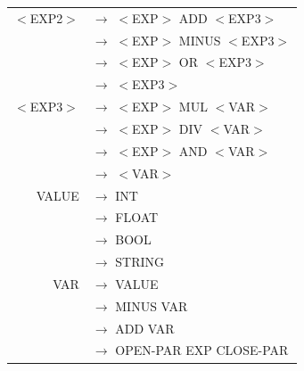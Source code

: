 \documentclass[a4paper,10pt]{article}
\begin{document}
\begin{tabular}{rl}
					
$<$EXP2$>$			& $\rightarrow$ $<$EXP$>$ ADD $<$EXP3$>$\\
					& $\rightarrow$ $<$EXP$>$ MINUS $<$EXP3$>$\\
					& $\rightarrow$ $<$EXP$>$ OR $<$EXP3$>$\\
					& $\rightarrow$ $<$EXP3$>$\\
					
$<$EXP3$>$			& $\rightarrow$ $<$EXP$>$ MUL $<$VAR$>$\\
					& $\rightarrow$ $<$EXP$>$ DIV $<$VAR$>$\\
					& $\rightarrow$ $<$EXP$>$ AND $<$VAR$>$\\
					& $\rightarrow$ $<$VAR$>$\\

VALUE				& $\rightarrow$ INT \\
					& $\rightarrow$ FLOAT \\
					& $\rightarrow$ BOOL \\
					& $\rightarrow$ STRING \\
					
VAR					& $\rightarrow$ VALUE \\
					& $\rightarrow$ MINUS VAR\\
					& $\rightarrow$ ADD VAR \\
					& $\rightarrow$ OPEN-PAR EXP CLOSE-PAR \\

\end{tabular}
\end{document}
